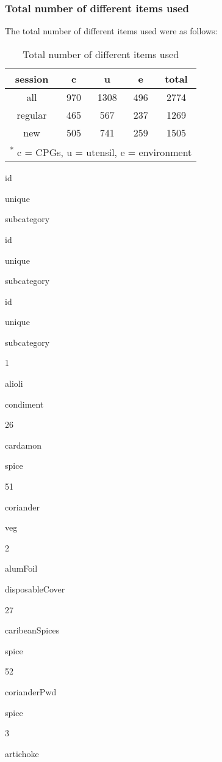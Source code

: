 \documentclass[]{article}
\begin{document}
\subsubsection{Total number of different items
used}\label{total-number-of-different-items-used}

The total number of different items used were as follows:

\begin{table}

\caption{\label{tab:unnamed-chunk-8}Total number of different items used}
\centering
\begin{tabular}[t]{c|c|c|c|c}
\hline
session & c & u & e & total\\
\hline
all & 970 & 1308 & 496 & 2774\\
\hline
regular & 465 & 567 & 237 & 1269\\
\hline
new & 505 & 741 & 259 & 1505\\
\hline
\multicolumn{5}{l}{\textsuperscript{*} c = CPGs, u = utensil, e = environment}\\
\end{tabular}
\end{table}

id

unique

subcategory

id

unique

subcategory

id

unique

subcategory

1

alioli

condiment

26

cardamon

spice

51

coriander

veg

2

alumFoil

disposableCover

27

caribeanSpices

spice

52

corianderPwd

spice

3

artichoke
\end{document}
